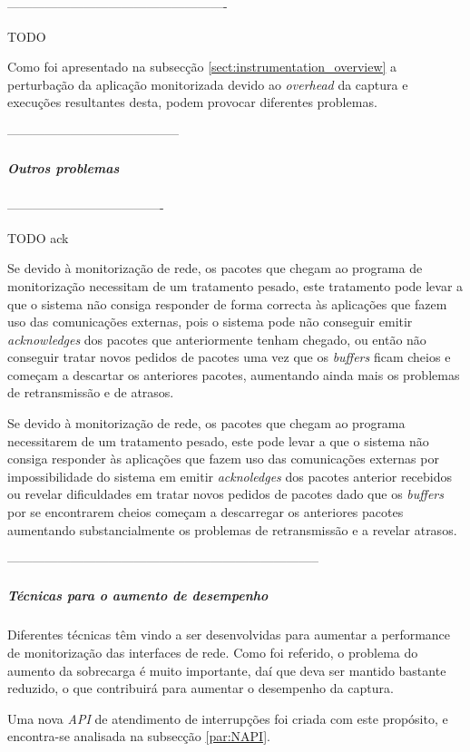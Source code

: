 ----------------------------------------------------

TODO

Como foi apresentado na subsecção \ref{sect:instrumentation_overview} a perturbação da aplicação monitorizada devido ao \textit{overhead} da captura e execuções resultantes desta, podem provocar diferentes problemas.

-----------------------------------------

\subparagraph*{Outros problemas
}

-------------------------------------

TODO ack

Se devido à monitorização de rede, os pacotes que chegam ao programa de monitorização necessitam de um tratamento pesado, este tratamento pode levar a que o sistema não consiga responder de forma correcta às aplicações que fazem uso das comunicações externas, pois o sistema pode não conseguir emitir \textit{acknowledges} dos pacotes que anteriormente tenham chegado, ou então não conseguir tratar novos pedidos de pacotes uma vez que os \textit{buffers} ficam cheios e começam a descartar os anteriores pacotes, aumentando ainda mais os problemas de retransmissão e de atrasos.

Se devido à monitorização de rede, os pacotes que chegam ao programa necessitarem de um tratamento pesado, este pode levar a que o sistema não consiga responder às aplicações que fazem uso das comunicações externas por impossibilidade do sistema em emitir \textit{acknoledges} dos pacotes anterior recebidos ou revelar dificuldades em tratar novos pedidos de pacotes dado que os \textit{buffers} por se encontrarem cheios começam a descarregar os anteriores pacotes aumentando substancialmente os problemas de retransmissão e a revelar atrasos.


--------------------------------------------------------------------------

\subparagraph*{Técnicas para o aumento de desempenho}
Diferentes técnicas têm vindo a ser desenvolvidas para aumentar a performance de monitorização das interfaces de rede.
Como foi referido, o problema do aumento da sobrecarga é muito importante, daí que deva ser mantido bastante reduzido, o que contribuirá para aumentar o desempenho da captura.

Uma nova \textit{API} de atendimento de interrupções foi criada com este propósito, e encontra-se analisada na subsecção \ref{par:NAPI}.

